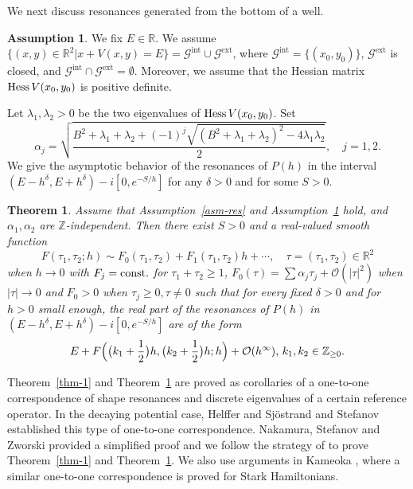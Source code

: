 \documentclass{article}
\theoremstyle{plain}
\newtheorem{thm}{Theorem}
\theoremstyle{definition}
\newtheorem{asm}{Assumption}
\theoremstyle{remark}
\newcommand{\RR}{\mathbb{R}}
\begin{document}
We next discuss resonances generated from the bottom of a well. 
\begin{asm}\label{asm-nondege} 
We fix $E\in \RR$. We assume $\{(x,y) \in \RR^2|x+V(x, y)=E\}=\mathcal{G}^{\mathrm{int}}\cup\mathcal{G}^{\mathrm{ext}}$, 
where $\mathcal{G}^{\mathrm{int}}=\{(x_0,y_0)\}$, 
$\mathcal{G}^{\mathrm{ext}}$ is closed, and $\mathcal{G}^{\mathrm{int}}\cap\mathcal{G}^{\mathrm{ext}}=\emptyset$. 
Moreover, we assume that the Hessian matrix 
${\rm Hess\,}V(x_0,y_0)$ is positive definite.
\end{asm}

Let $\lambda_1,\lambda_2>0$ be the two eigenvalues of ${\rm Hess\,}V(x_0,y_0)$. 
Set 
\begin{equation}\label{alphaj}
\alpha_{j}=\sqrt{\frac{B^2+\lambda_1+\lambda_2+(-1)^j
\sqrt{(B^2+\lambda_1+\lambda_2)^2-4\lambda_1\lambda_2}}{2}},\quad j=1,2.
\end{equation}
We give the asymptotic behavior of the resonances of $P(h)$
in the interval
$(E-h^{\delta}, E+h^{\delta})-i[0,e^{-S/h}]$
for any $\delta >0$ and for some $S>0$.

\begin{thm}\label{thm-2}
Assume that Assumption~\ref{asm-res} and Assumption~\ref{asm-nondege} hold, 
and $\alpha_1,\alpha_2$ are $\mathbb{Z}$-independent. 
Then there exist $S>0$ and a real-valued smooth function
$$
F(\tau_1,\tau_2;h)\sim F_0(\tau_1,\tau_2)+F_1(\tau_1,\tau_2)h+\cdots,\quad \tau=(\tau_1, \tau_2)\in\RR^2 
$$
when $h\to 0$ with $F_j={\rm const.}$ for $\tau_1+\tau_2\geq1$, 
$F_0(\tau)=\sum\alpha_j\tau_j+\mathcal{O}(|\tau|^2)$ when $|\tau|\to 0$ 
and $F_0>0$ when $\tau_j\geq0, \tau\not=0$
such that for every fixed $\delta>0$ and for $h>0$ small enough, the real part of the resonances of $P(h)$ in 
$(E-h^{\delta}, E+h^{\delta})-i[0,e^{-S/h}]$ are of the form
$$
E+F\Bigl(\bigl(k_1+\frac{1}{2}\bigr)h,\bigl(k_2+\frac{1}{2}\bigr)h;h\Bigr)+\mathcal{O}(h^{\infty}),\,k_1,k_2\in\mathbb{Z}_{\ge 0}.
$$
\end{thm}

Theorem~\ref{thm-1} and Theorem~\ref{thm-2} 
are proved as corollaries of a one-to-one correspondence of shape resonances and discrete eigenvalues 
of a certain reference operator. 
In the decaying potential case, Helffer and Sj\"{o}strand \cite{HeSjo} and 
Stefanov \cite{S} \cite{S2} established this type of one-to-one correspondence.  
Nakamura, Stefanov and Zworski \cite{NSZ} provided a simplified proof and we follow the strategy of 
\cite{NSZ} to prove Theorem~\ref{thm-1} and Theorem~\ref{thm-2}. 
We also use arguments in Kameoka \cite{K1}, 
where a similar one-to-one correspondence is proved for Stark Hamiltonians. 
\end{document}
